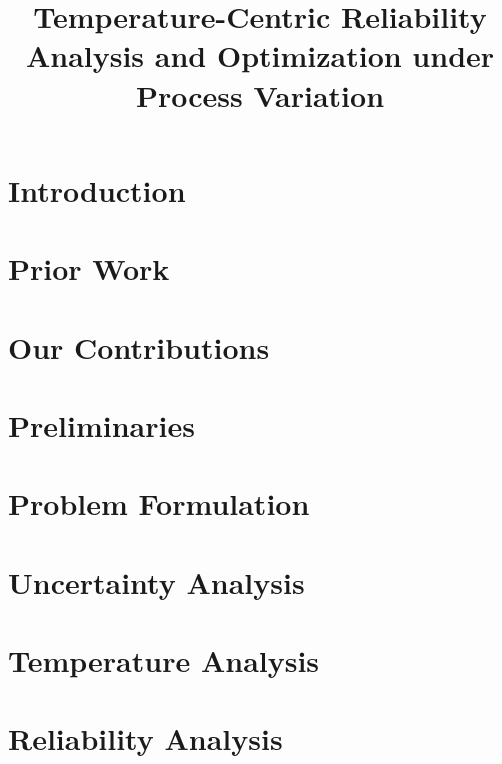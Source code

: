 \documentclass[conference]{IEEEtran}
\title{Temperature-Centric Reliability Analysis and Optimization under Process Variation}
\author{}
\begin{document}
  \maketitle

  \begin{abstract}
    
  \end{abstract}


  \section{Introduction} 
  

  \section{Prior Work} 
  

  \section{Our Contributions} 
  

  \section{Preliminaries} 
  

  \section{Problem Formulation} 
  

  \section{Uncertainty Analysis} 
  

  \section{Temperature Analysis} 
  

  \section{Reliability Analysis} 
  
\end{document}

